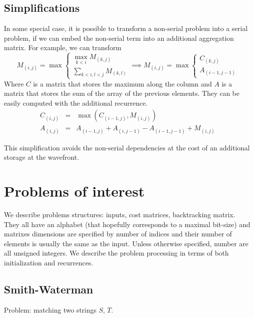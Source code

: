 \documentclass[11pt]{article}
\begin{document}
\subsection{Simplifications}
In some special case, it is possible to transform a non-serial problem into a serial problem, if we can embed the non-serial term into an additional aggregation matrix. For example, we can transform
	\[M_{(i,j)}=\max\left\{\begin{array}{l} \max\limits_{k<i} M_{(k,j)}
	\\ \sum\limits_{k<i, l<j}M_{(k,l)} \end{array}\right.
	\implies M_{(i,j)}=\max\left\{\begin{array}{l} C_{(k,j)} \\ A_{(i-1,j-1)} \end{array}\right.\]
Where $C$ is a matrix that stores the maximum along the column and $A$ is a matrix that stores the sum of the array of the previous elements. They can be easily computed with the additional recurrence.
	\[\begin{array}{rcl} C_{(i,j)}&=&\max(C_{(i-1,j)}, M_{(i,j)}) \\
	A_{(i,j)}&=&A_{(i-1,j)}+A_{(i,j-1)}-A_{(i-1,j-1)}+M_{(i,j)}\end{array}\]

This simplification avoids the non-serial dependencies at the cost of an additional storage at the wavefront.


\section{Problems of interest}
We describe problems structures: inputs, cost matrices, backtracking matrix. They all have an alphabet (that hopefully corresponds to a maximal bit-size) and matrixes dimensions are specified by number of indices and their number of elements is usually the same as the input. Unless otherwise specified, number are all unsigned integers. We describe the problem processing in terms of both initialization and recurrences.

\subsection{Smith-Waterman}
Problem: matching two strings $S$, $T$.
\end{document}
